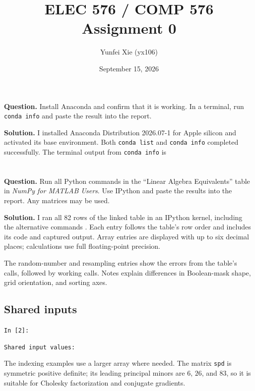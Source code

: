 \documentclass[11pt]{article}
\title{ELEC 576 / COMP 576\\[1ex]\large Assignment 0}
\author{Yunfei Xie (yx106)}
\date{September 15, 2026}
\newcommand{\solution}{\par\medskip\noindent\textbf{Solution.}\enspace\ignorespaces}
\begin{document}
\maketitle

\section*{}
\textbf{Question.}
Install Anaconda and confirm that it is working. In a terminal, run
\texttt{conda info} and paste the result into the report.

\solution
I installed Anaconda Distribution 2026.07-1 for Apple silicon and
activated its base environment. Both \texttt{conda list} and
\texttt{conda info} completed successfully. The terminal output from
\texttt{conda info} is


\clearpage
\section*{}
\textbf{Question.}
Run all Python commands in the ``Linear Algebra Equivalents'' table in
\emph{NumPy for MATLAB Users}. Use IPython and paste the results into
the report. Any matrices may be used.

\solution
I ran all 82 rows of the linked table in an IPython kernel, including
the alternative commands \cite{numpy}. Each entry follows the table's
row order and includes its code and captured output. Array entries are
displayed with up to six decimal places; calculations use full
floating-point precision.

The random-number and resampling entries show the errors from the
table's calls, followed by working calls. Notes explain differences in
Boolean-mask shape, grid orientation, and sorting axes.

\subsection*{Shared inputs}
\noindent\texttt{In [2]:}

\par\noindent\begin{minipage}{\linewidth}
\noindent\texttt{Shared input values:}

\end{minipage}\par
The indexing examples use a larger array where needed. The matrix
\texttt{spd} is symmetric positive definite; its leading principal
minors are $6$, $26$, and $83$, so it is suitable for Cholesky
factorization and conjugate gradients.
\end{document}
